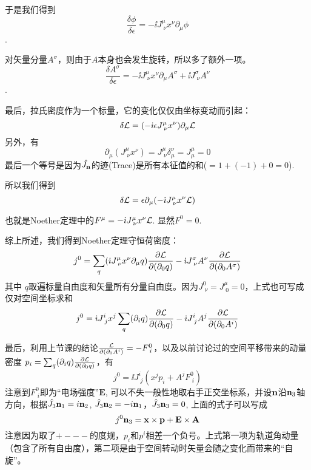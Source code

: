 \documentclass[CJK]{beamer}
\begin{document}
\begin{frame}
\bch
于是我们得到
$$\frac{\delta \phi}{\delta\epsilon} = -\ii  J^\mu_{\;\nu} x^\nu \partial_\mu \phi$$.

\skipline
对矢量分量$A^\sigma$，则由于$A$本身也会发生旋转，所以多了额外一项。
$$\frac{\delta A^\sigma}{\delta\epsilon} = -\ii  J^\mu_{\;\nu} x^\nu\partial_\mu A^\sigma + \ii J^\sigma_{\;\nu}A^\nu$$.

\ech
\end{frame}

\begin{frame}
\bch
最后，拉氏密度作为一个标量，它的变化仅仅由坐标变动而引起：
$$ \delta {\mathcal{L}} = (-{\dot{\imath}} \epsilon J^\mu_{\;\nu} x^\nu)\partial_\mu {\mathcal{L}} $$
另外，有
$$\partial_\mu(J^\mu_{\;\nu} x^\nu) = J^\mu_{\;\nu} \delta^\nu_\mu = J^\mu_\mu = 0 $$
最后一个等号是因为${\hat{J_{\mathbf{n}}}}$的迹(Trace)是所有本征值的和($=1+(-1)+0 = 0$).

所以我们得到
$$\delta {\mathcal{L}} = \epsilon \partial_\mu (-{\dot{\imath}}  J^\mu_{\;\nu} x^\nu {\mathcal{L}}) $$

也就是Noether定理中的$F^\mu = -{\dot{\imath}}  J^\mu_{\;\nu} x^\nu {\mathcal{L}}$. 显然$F^0 = 0$.
\ech
\end{frame}

\begin{frame}
\bch
综上所述，我们得到Noether定理守恒荷密度：
$$j^0 =   \sum_q({\dot{\imath}}  J^\mu_{\;\nu} x^\nu \partial_\mu q) \frac{\partial {\mathcal{L}}}{\partial(\partial_0 q)} - {\dot{\imath}} J^\sigma_{\;\nu}A^\nu \frac{\partial {\mathcal{L}}}{\partial(\partial_0 A^\sigma)}$$
其中 $q$取遍标量自由度和矢量所有分量自由度。因为$J^0_{\;\nu} = J^\mu_{\;0} = 0$，上式也可写成仅对空间坐标求和
$$j^0 =  {\dot{\imath}}  J^i_{\;j} x^j \sum_q(\partial_i q )\frac{\partial {\mathcal{L}}}{\partial(\partial_0 q)} - {\dot{\imath}} J^i_{\;j}A^j \frac{\partial {\mathcal{L}}}{\partial(\partial_0 A^i)}$$
\ech
\end{frame}

\begin{frame}
\bch
最后，利用上节课的结论$\frac{{\mathcal{L}}}{\partial(\partial_0 A^i)} = - F^0_{\; i}$，以及以前讨论过的空间平移带来的动量密度
$p_i = \sum_q(\partial_i q )\frac{\partial {\mathcal{L}}}{\partial(\partial_0 q)} $，有
$$j^0 =  \ii  J^i_{\;j} (x^j p_i + A^j F^0_{\;i} )$$
注意到$F^0_{\;i}$即为“电场强度”$\mathbf{E}$, 可以不失一般性地取右手正交坐标系，并设${\mathbf{n}}$沿${\mathbf{n}}_3$轴方向，根据$\hat{J_{3}}{\mathbf{n}}_1 = i {\mathbf{n}}_2$, $\hat{J_{3}}{\mathbf{n}}_2 = - i{\mathbf{n}}_1$，$\hat{J_{3}}{\mathbf{n}}_3 = 0$, 上面的式子可以写成
$$j^0{\mathbf{n}}_3 = {\mathbf{x}} \times {\mathbf{p}} + \mathbf{E} \times \mathbf{A}$$
注意因为取了$+---$的度规，$p_i$和$p^i$相差一个负号。上式第一项为轨道角动量（包含了所有自由度），第二项是由于空间转动时矢量会随之变化而带来的“自旋”。
\ech
\end{frame}
\end{document}
